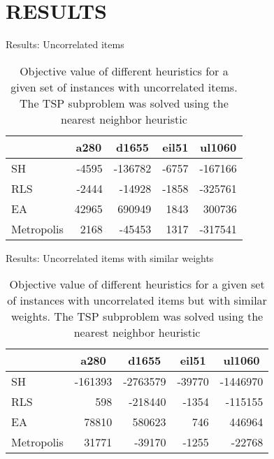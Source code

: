 \documentclass[newPxFont]{beamer}
\begin{document}
%
%

\section{\textup{RESULTS}}

\begin{frame}{Results: Uncorrelated items}
\vspace{-2em}
\begin{table}[]
	\caption{Objective value of different heuristics for a given set of instances with uncorrelated
	items. The TSP subproblem was solved using the nearest neighbor heuristic}
	\begin{tabular}[]{lrrrr}
		\toprule
		\textbf{}			& \multicolumn{1}{c}{\textbf{a280}}
		                    & \multicolumn{1}{c}{\textbf{d1655}}
		                    & \multicolumn{1}{c}{\textbf{eil51}}
		                    & \multicolumn{1}{c}{\textbf{ul1060}} \\
		\midrule                                           
		SH				& -4595 & -136782 & -6757 & -167166	\\[0.25em]
		RLS				& -2444 & -14928 & -1858 & -325761  \\[0.25em]
		EA				& 42965 & 690949 & 1843 & 300736   	\\[0.25em]
		Metropolis		& 2168 & -45453 & 1317 & -317541	\\
		\bottomrule
	\end{tabular}
	\label{tab:WindowFunctions}
\end{table}
\end{frame}


\begin{frame}{Results: Uncorrelated	items with similar weights}
\vspace{-2em}
\begin{table}[]
	\caption{Objective value of different heuristics for a given set of instances with uncorrelated
	items but with similar weights. The TSP subproblem was solved using the nearest neighbor
	heuristic}
	\begin{tabular}[]{lrrrr}
		\toprule
		\textbf{}			& \multicolumn{1}{c}{\textbf{a280}}
		                    & \multicolumn{1}{c}{\textbf{d1655}}
		                    & \multicolumn{1}{c}{\textbf{eil51}}
		                    & \multicolumn{1}{c}{\textbf{ul1060}} \\
		\midrule                                           
		SH				& -161393 & -2763579 & -39770 & -1446970	\\[0.25em]
		RLS				& 598     & -218440  & -1354  & -115155	    \\[0.25em]
		EA				& 78810   & 580623   & 746    & 446964   	\\[0.25em]
		Metropolis		& 31771   & -39170   & -1255  & -22768	\\
		\bottomrule
	\end{tabular}
	\label{tab:WindowFunctions}
\end{table}
\end{frame}
\end{document}
